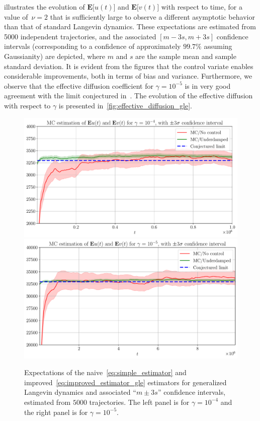 \documentclass[11pt,a4paper]{article}
\newcommand{\expect}[0]{\mathbf{E}}
\theoremstyle{plain}
\numberwithin{equation}{section}
\begin{document}
 illustrates the evolution of $\expect \bigl[ u(t) \bigr]$ and $\expect \bigl[ v(t) \bigr]$ with respect to time,
for a value of~$\nu = 2$ that is sufficiently large to observe a different asymptotic behavior than that of standard Langevin dynamics.
These expectations are estimated from 5000 independent trajectories,
and the associated $[m - 3 s, m + 3 s]$ confidence intervals (corresponding to a confidence of approximately $99.7\%$ assuming Gaussianity) are depicted,
where $m$ and $s$ are the sample mean and sample standard deviation.
It is evident from the figures that the control variate enables considerable improvements,
both in terms of bias and variance.
Furthermore, we observe that the effective diffusion coefficient for $\gamma = 10^{-5}$
is in very good agreement with the limit conjectured in~\cite{GPGSUV21}.
The evolution of the effective diffusion with respect to $\gamma$ is presented in~\cref{fig:effective_diffusion_gle}.
\begin{figure}[ht]
    \centering
    \includegraphics[width=0.495\linewidth]{figures/time-gle-4.pdf}
    \includegraphics[width=0.495\linewidth]{figures/time-gle-5.pdf}
    \caption{%
        Expectations of the naive~\eqref{eq:simple_estimator} and improved~\eqref{eq:improved_estimator_gle} estimators for generalized Langevin dynamics
        and associated ``$m \pm 3 s$'' confidence intervals,
        estimated from $5000$ trajectories.
        The left panel is for $\gamma = 10^{-4}$ and the right panel is for $\gamma = 10^{-5}$.
    }
    \label{fig:effective_diffusion_time_gle}
\end{figure}
\end{document}

